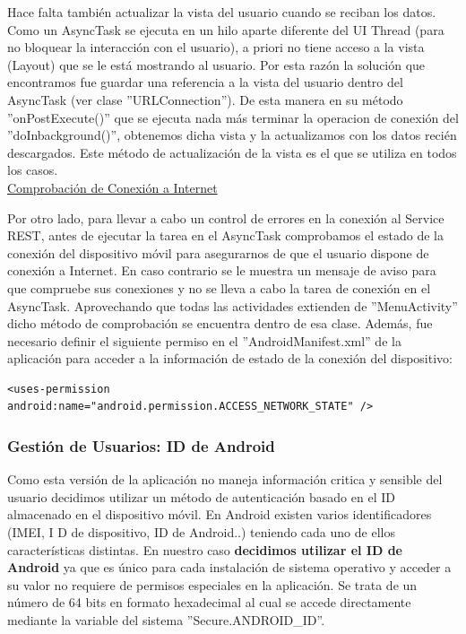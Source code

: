 	Hace falta también actualizar la vista del usuario cuando se reciban los datos. Como un AsyncTask se ejecuta en un hilo aparte diferente del UI Thread (para no bloquear la interacción con el usuario), a priori no tiene acceso a la vista (Layout) que se le está mostrando al usuario. Por esta razón la solución que encontramos fue guardar una referencia a la vista del usuario dentro del AsyncTask (ver clase ''URLConnection''). De esta manera en su método ''onPostExecute()'' que se ejecuta nada más terminar la operacion de conexión del ''doInbackground()'', obtenemos dicha vista y la actualizamos con los datos recién descargados. Este método de actualización de la vista es el que se utiliza en todos los casos. \\
		
		\underline{Comprobación de Conexión a Internet}
		
		Por otro lado, para llevar a cabo un control de errores en la conexión al Service REST, antes de ejecutar la tarea en el AsyncTask comprobamos el estado de la conexión del dispositivo móvil para asegurarnos de que el usuario dispone de conexión a Internet. En caso contrario se le muestra un mensaje de aviso para que compruebe sus conexiones y no se lleva a cabo la tarea de conexión en el AsyncTask. Aprovechando que todas las actividades extienden de ''MenuActivity'' dicho método de comprobación se encuentra dentro de esa clase. Además, fue necesario definir el siguiente permiso en el ''AndroidManifest.xml'' de la aplicación para acceder a la información de estado de la conexión del dispositivo:
		
		  \lstset{language=XML, breaklines=true, autogobble=true, basicstyle=\ttfamily\footnotesize}
	  \begin{lstlisting}[frame=single]
	  <uses-permission android:name="android.permission.ACCESS_NETWORK_STATE" />
	  \end{lstlisting}
		
	\subsubsection{Gestión de Usuarios: ID de Android}
	
		Como esta versión de la aplicación no maneja información critica y sensible del usuario decidimos utilizar un método de autenticación basado en el ID almacenado en el dispositivo móvil. En Android existen varios identificadores (IMEI, I	D de dispositivo, ID de Android..) teniendo cada uno de ellos características distintas. En nuestro caso \textbf{decidimos utilizar el ID de Android} \cite{ref:android_secure} ya que es único para cada instalación de sistema operativo y acceder a su valor no requiere de permisos especiales en la aplicación. Se trata de un número de 64 bits en formato hexadecimal al cual se accede directamente mediante la variable del sistema ''Secure.ANDROID\_ID''.
		
